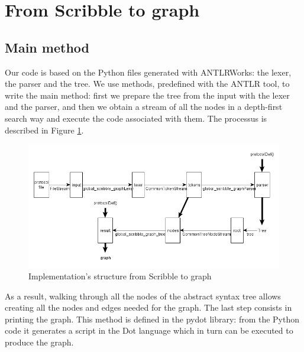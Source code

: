 \documentclass[a4paper,11pt,twoside]{report}
\begin{document}
\section{From Scribble to graph}

\subsection{Main method}

Our code is based on the Python files generated with ANTLRWorks: the lexer, the parser and the tree. We use methods, predefined with the ANTLR tool, to write the main method: first we prepare the tree from the input with the lexer and the parser, and then we obtain a stream of all the nodes in a depth-first search way and execute the code associated with them. The processus is described in Figure \ref{fig:scrtograph}.

\begin{figure}[h]
\begin{center}
\includegraphics[scale=0.65]{scrtograph}
\end{center}
\caption{Implementation's structure from Scribble to graph}
\label{fig:scrtograph}
\end{figure}

As a result, walking through all the nodes of the abstract syntax tree allows creating all the nodes and edges needed for the graph. The last step consists in printing the graph. This method is defined in the pydot library: from the Python code it generates a script in the Dot language which in turn can be executed to produce the graph.
\end{document}
